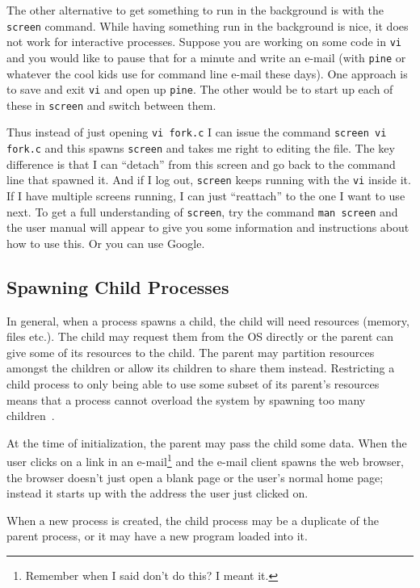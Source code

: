 The other alternative to get something to run in the background is with the \texttt{screen} command. While having something run in the background is nice, it does not work for interactive processes. Suppose you are working on some code in \texttt{vi} and you would like to pause that for a minute and write an e-mail (with \texttt{pine} or whatever the cool kids use for command line e-mail these days). One approach is to save and exit \texttt{vi} and open up \texttt{pine}. The other would be to start up each of these in \texttt{screen} and switch between them. 

Thus instead of just opening \texttt{vi fork.c} I can issue the command \texttt{screen vi fork.c} and this spawns \texttt{screen} and takes me right to editing the file. The key difference is that I can ``detach'' from this screen and go back to the command line that spawned it. And if I log out, \texttt{screen} keeps running with the \texttt{vi} inside it. If I have multiple screens running, I can just ``reattach'' to the one I want to use next. To get a full understanding of \texttt{screen}, try the command \texttt{man screen} and the user manual will appear to give you some information and instructions about how to use this. Or you can use Google. 

\subsection*{Spawning Child Processes}

In general, when a process spawns a child, the child will need resources (memory, files etc.). The child may request them from the OS directly or the parent can give some of its resources to the child. The parent may partition resources amongst the children or allow its children to share them instead. Restricting a child process to only being able to use some subset of its parent's resources means that a process cannot overload the system by spawning too many children~\cite{osc}.

At the time of initialization, the parent may pass the child some data. When the user clicks on a link in an e-mail\footnote{Remember when I said don't do this? I meant it.} and the e-mail client spawns the web browser, the browser doesn't just open a blank page or the user's normal home page; instead it starts up with the address the user just clicked on.

When a new process is created, the child process may be a duplicate of the parent process, or it may have a new program loaded into it.


